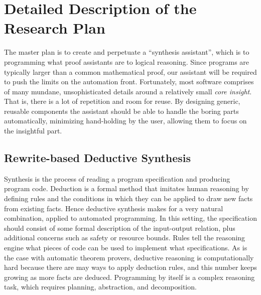 \section{Detailed Description of the Research Plan}

The master plan is to create and perpetuate a ``synthesis assistant'',
which is to programming what proof assistants are to logical reasoning.
Since programs are typically larger than a common mathematical proof,
our assistant will be required to push the limits on the automation
front.
Fortunately, most software comprises of many mundane, unsophisticated
details around a relatively small \emph{core insight}.
That is, there is a lot of repetition and room for reuse.
By designing generic, reusable components the assistant should be able
to handle the boring parts automatically, minimizing hand-holding by
the user, allowing them to focus on the insightful part.

\subsection{Rewrite-based Deductive Synthesis}

Synthesis is the process of reading a program specification and
producing program code.
Deduction is a formal method that imitates human reasoning by defining
rules and the conditions in which they can be applied to draw new facts
from existing facts.
Hence deductive synthesis makes for a very natural combination, applied
to automated programming.
In this setting, the specification should consist of some formal description
of the input-output relation, plus additional concerns such as safety or
resource bounds.
Rules tell the reasoning engine what pieces of code can be used to implement
what specifications.
As is the case with automatic theorem provers, deductive reasoning is
computationally hard because there are may ways to apply deduction rules,
and this number keeps growing as more facts are deduced.
Programming by itself is a complex reasoning task, which requires planning,
abstraction, and decomposition.


